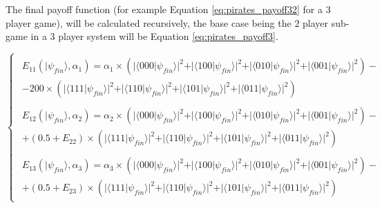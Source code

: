 The final payoff function (for example Equation \ref{eq:pirates_payoff32} for a $3$ player game), will be calculated recursively, the base case being the $2$ player sub-game in a $3$ player system will be Equation \ref{eq:pirates_payoff3}.

 

 \begin{equation}
 \begin{cases}
\begin{split}
E_{11}(\vert\psi_{fin}\rangle, \alpha_{1})=\alpha_{1}\times(\vert\langle000\vert\psi_{fin}\rangle\vert^{2} + \vert\langle100\vert\psi_{fin}\rangle\vert^{2}
+ \vert\langle010\vert\psi_{fin}\rangle\vert^{2}
+ \vert\langle001\vert\psi_{fin}\rangle\vert^{2}
 ) - \\
 - 200\times(\vert\langle111\vert\psi_{fin}\rangle\vert^{2} + \vert\langle110\vert\psi_{fin}\rangle\vert^{2}
+ \vert\langle101\vert\psi_{fin}\rangle\vert^{2}
+ \vert\langle011\vert\psi_{fin}\rangle\vert^{2}
 )
\end{split}
\\
\begin{split}
E_{12}(\vert\psi_{fin}\rangle, \alpha_{2})=\alpha_{2}\times(\vert\langle000\vert\psi_{fin}\rangle\vert^{2} + \vert\langle100\vert\psi_{fin}\rangle\vert^{2}
+ \vert\langle010\vert\psi_{fin}\rangle\vert^{2}
+ \vert\langle001\vert\psi_{fin}\rangle\vert^{2}
 ) - \\
 + (0.5 + E_{22})\times(\vert\langle111\vert\psi_{fin}\rangle\vert^{2} + \vert\langle110\vert\psi_{fin}\rangle\vert^{2}
+ \vert\langle101\vert\psi_{fin}\rangle\vert^{2}
+ \vert\langle011\vert\psi_{fin}\rangle\vert^{2}
 )
\end{split}
\\
\begin{split}
E_{13}(\vert\psi_{fin}\rangle, \alpha_{3})=\alpha_{3}\times(\vert\langle000\vert\psi_{fin}\rangle\vert^{2} + \vert\langle100\vert\psi_{fin}\rangle\vert^{2}
+ \vert\langle010\vert\psi_{fin}\rangle\vert^{2}
+ \vert\langle001\vert\psi_{fin}\rangle\vert^{2}
 ) - \\
 + (0.5 + E_{23})\times(\vert\langle111\vert\psi_{fin}\rangle\vert^{2} + \vert\langle110\vert\psi_{fin}\rangle\vert^{2}
+ \vert\langle101\vert\psi_{fin}\rangle\vert^{2}
+ \vert\langle011\vert\psi_{fin}\rangle\vert^{2}
 )
\end{split}
\end{cases}
\label{eq:pirates_payoff32}
\end{equation}


